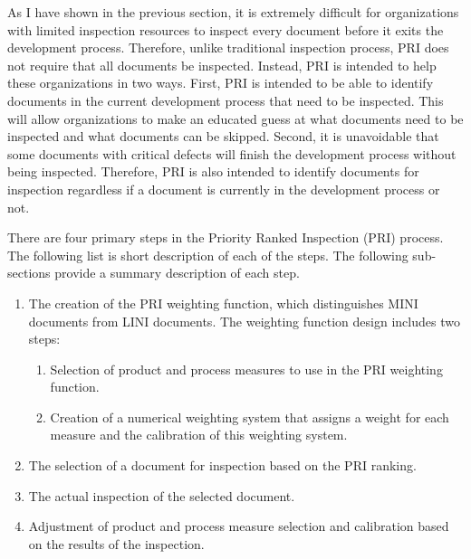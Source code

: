 As I have shown in the previous section, it is extremely difficult for
organizations with limited inspection resources to inspect every document
before it exits the development process. Therefore, unlike traditional
inspection process, PRI does not require that all documents be inspected.
Instead, PRI is intended to help these organizations in two ways. First,
PRI is intended to be able to identify documents in the current development
process that need to be inspected. This will allow organizations to make an
educated guess at what documents need to be inspected and what documents
can be skipped. Second, it is unavoidable that some documents with critical
defects will finish the development process without being inspected.
Therefore, PRI is also intended to identify documents for inspection
regardless if a document is currently in the development process or not.


There are four primary steps in the Priority Ranked Inspection (PRI)
process. The following list is short description of each of the steps. The
following sub-sections provide a summary description of each step.

\begin{enumerate}
\item The creation of the PRI weighting function, which distinguishes
  MINI documents from LINI documents. The weighting function design
  includes two steps: 
\begin{enumerate}
\item Selection of product and process measures to use in the PRI
  weighting function.
\item Creation of a numerical weighting system that assigns a weight for
  each measure and the calibration of this weighting system.
\end{enumerate}
\item The selection of a document for inspection based on the PRI
  ranking.
\item The actual inspection of the selected document.
\item Adjustment of product and process measure selection and
  calibration based on the results of the inspection.
\end{enumerate}


